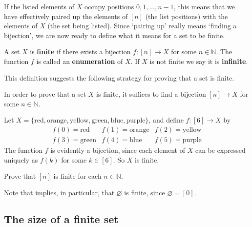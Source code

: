 If the listed elements of $X$ occupy positions $0,1,\dots,{n-1}$, this means that we have effectively paired up the elements of $[n]$ (the list positions) with the elements of $X$ (the set being listed). Since `pairing up' really means `finding a bijection', we are now ready to define what it means for a set to be finite.

\begin{definition}
\label{defFiniteSet}
A set $X$ is \textbf{finite} if there exists a bijection $f : [n] \to X$ for some $n \in \mathbb{N}$. The function $f$ is called an \textbf{enumeration} of $X$. If $X$ is not finite we say it is \textbf{infinite}.
\end{definition}

This definition suggests the following strategy for proving that a set is finite.

\begin{strategy}
In order to prove that a set $X$ is finite, it suffices to find a bijection $[n] \to X$ for some $n \in \mathbb{N}$.
\end{strategy}

\begin{example}
\label{exSomeFiniteSets}
Let $X = \{ \text{red}, \text{orange}, \text{yellow}, \text{green}, \text{blue}, \text{purple} \}$, and define $f : [6] \to X$ by
\[ \begin{matrix}
f(0) = \text{red} & f(1) = \text{orange} & f(2) = \text{yellow} \\
f(3) = \text{green} & f(4) = \text{blue} & f(5) = \text{purple}
\end{matrix} \]
The function $f$ is evidently a bijection, since each element of $X$ can be expressed uniquely as $f(k)$ for some $k \in [6]$. So $X$ is finite.
\end{example}

\begin{exercise}
\label{exBracketNIsFinite}
Prove that $[n]$ is finite for each $n \in \mathbb{N}$.
\end{exercise}

Note that  implies, in particular, that $\varnothing$ is finite, since $\varnothing = [0]$.

\subsection*{The size of a finite set}

